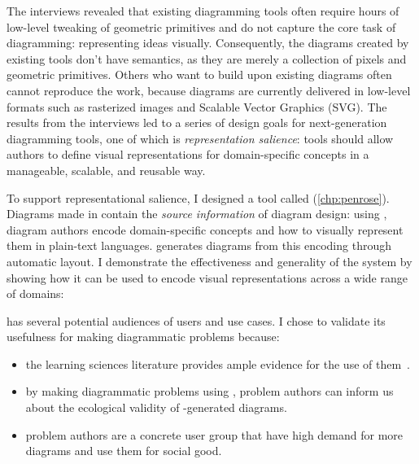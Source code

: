 \noindent The interviews revealed that existing diagramming tools often require hours of low-level tweaking of geometric primitives and do not capture the core task of diagramming: representing ideas visually. Consequently, the diagrams created by existing tools don't have semantics, as they are merely a collection of pixels and geometric primitives. Others who want to build upon existing diagrams often cannot reproduce the work, because diagrams are currently delivered in low-level formats such as rasterized images and Scalable Vector Graphics (SVG). The results from the interviews led to a series of design goals for next-generation diagramming tools, one of which is \textit{representation salience}: tools should allow authors to define visual representations for domain-specific concepts in a manageable, scalable, and reusable way. 

To support representational salience, I designed a tool called \Penrose (\cref{chp:penrose}). Diagrams made in \Penrose contain the \emph{source information} of diagram design: using \Penrose, diagram authors encode domain-specific concepts and how to visually represent them in plain-text languages. \Penrose generates diagrams from this encoding through automatic layout. I demonstrate the effectiveness and generality of the system by showing how it can be used to encode visual representations across a wide range of domains:

\label{rq:expressiveness}

\Penrose has several potential audiences of users and use cases. I chose to validate its usefulness for making diagrammatic problems because:

\begin{itemize}
    \item the learning sciences literature provides ample evidence for the use of them~\cite{multipleReps, mayer_multimedia_2002, blum_combining_1998}.
    \item by making diagrammatic problems using \Penrose, problem authors can inform us about the ecological validity of \Penrose-generated diagrams.
    \item problem authors are a concrete user group that have high demand for more diagrams and use them for social good.
\end{itemize}

